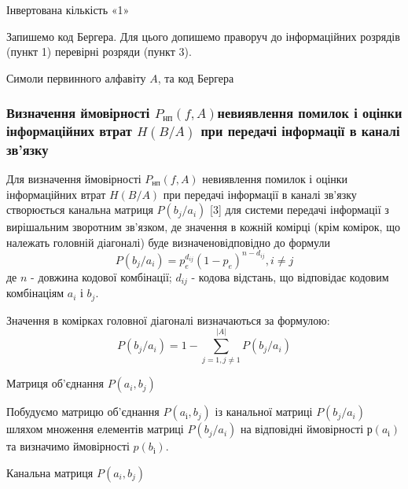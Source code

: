 \documentclass[a4paper,14pt]{extreport}
\begin{document}
\begin{table}[H]
	\caption{Інвертована кількість «1» }
	\centering
	
	\label{table:codewords-control_bits_inverterd}
\end{table}
Запишемо код Бергера.
Для цього допишемо праворуч до інформаційних
розрядів (пункт 1) перевірні розряди (пункт 3).

\begin{table}[H]
	\caption{Симоли первинного алфавіту $A$, та код Бергера}
	\centering
	
	\label{table:berger-code}
\end{table}

\subsubsection{Визначення ймовірності $P_{\text{нп}} (f,A)$невиявлення помилок і оцінки інформаційних втрат $H(B/A)$ при передачі	інформації в каналі зв'язку}

Для визначення ймовірності $P_{\text{нп}} (f,A)$
невиявлення помилок і оцінки інформаційних втрат $H(B/A)$ при передачі інформації в каналі зв'язку створюється канальна матриця $P(b_j/a_i)$ [3] для системи передачі інформації з вирішальним зворотним зв'язком, де значення в кожній комірці (крім комірок, що належать головній діагоналі) буде визначеновідповідно до формули
$$P(b_j/a_i) = p_e^{d_{ij}}(1-p_e)^{n-d_{ij}}, i \neq j$$
де $n$ - довжина кодової комбінації;
$d_{ij}$ - кодова відстань, що відповідає кодовим комбінаціям $a_i$ і $b_j$.

Значення в комірках головної діагоналі визначаються за формулою:
$$P(b_j/a_i) = 1- \sum_{j=1,j \neq 1}^{|A|} P(b_j/a_i) $$


\begin{table}[H]
	\caption{Матриця об'єднання $P(a_i, b_j)$}
	\centering
	\resizebox{\columnwidth}{!}{%
	
}
	\label{table:joint_matrix}
\end{table}

Побудуємо матрицю об’єднання $P(a_{і}, b_{j} )$ із канальної матриці $P(b_j / a_i)$ шляхом множення елементів матриці  $P(b_j / a_i)$  на відповідні ймовірності $р(a_{і} )$ та визначимо ймовірності $p(b_{і} )$.

\begin{table}[H]
	\caption{Канальна матриця $P(a_i, b_j)$}
	\centering
	\resizebox{\columnwidth}{!}{%
		
	}
	\label{table:chennel_matrix}
\end{table}
\end{document}
